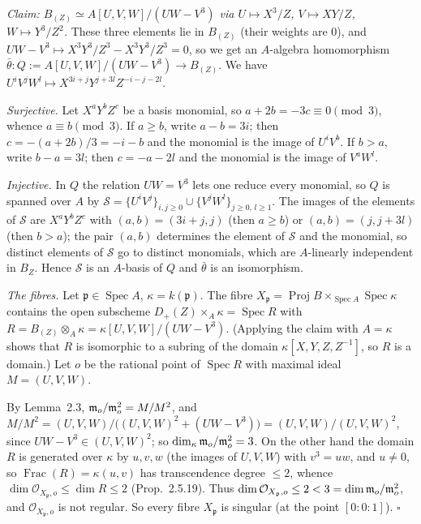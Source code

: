 \documentclass[11pt]{article}
\begin{document}
\emph{Claim: $B_{(Z)}\simeq A[U,V,W]/(UW-V^3)$ via $U\mapsto X^3/Z$, $V\mapsto XY/Z$, $W\mapsto Y^3/Z^2$.} These three elements lie in $B_{(Z)}$ (their weights are $0$), and $UW-V^3\mapsto X^3Y^3/Z^3-X^3Y^3/Z^3=0$, so we get an $A$-algebra homomorphism $\bar\theta:Q:=A[U,V,W]/(UW-V^3)\to B_{(Z)}$. We have $U^iV^jW^l\mapsto X^{3i+j}Y^{j+3l}Z^{-i-j-2l}$.

\emph{Surjective.} Let $X^aY^bZ^c$ be a basis monomial, so $a+2b=-3c\equiv0\pmod3$, whence $a\equiv b\pmod 3$. If $a\ge b$, write $a-b=3i$; then $c=-(a+2b)/3=-i-b$ and the monomial is the image of $U^iV^b$. If $b>a$, write $b-a=3l$; then $c=-a-2l$ and the monomial is the image of $V^aW^l$.

\emph{Injective.} In $Q$ the relation $UW=V^3$ lets one reduce every monomial, so $Q$ is spanned over $A$ by $\mathcal S=\{U^iV^j\}_{i,j\ge0}\cup\{V^jW^l\}_{j\ge0,\,l\ge1}$. The images of the elements of $\mathcal S$ are $X^aY^bZ^c$ with $(a,b)=(3i+j,j)$ (then $a\ge b$) or $(a,b)=(j,j+3l)$ (then $b>a$); the pair $(a,b)$ determines the element of $\mathcal S$ and the monomial, so distinct elements of $\mathcal S$ go to distinct monomials, which are $A$-linearly independent in $B_Z$. Hence $\mathcal S$ is an $A$-basis of $Q$ and $\bar\theta$ is an isomorphism.

\emph{The fibres.} Let $\mathfrak p\in\operatorname{Spec}A$, $\kappa=k(\mathfrak p)$. The fibre $X_{\mathfrak p}=\operatorname{Proj}B\times_{\operatorname{Spec}A}\operatorname{Spec}\kappa$ contains the open subscheme $D_+(Z)\times_A\kappa=\operatorname{Spec}R$ with $R=B_{(Z)}\otimes_A\kappa=\kappa[U,V,W]/(UW-V^3)$. (Applying the claim with $A=\kappa$ shows that $R$ is isomorphic to a subring of the domain $\kappa[X,Y,Z,Z^{-1}]$, so $R$ is a domain.) Let $o$ be the rational point of $\operatorname{Spec}R$ with maximal ideal $M=(U,V,W)$.

By Lemma~2.3, $\mathfrak m_o/\mathfrak m_o^2=M/M^2$, and $M/M^2=(U,V,W)/\bigl((U,V,W)^2+(UW-V^3)\bigr)=(U,V,W)/(U,V,W)^2$, since $UW-V^3\in(U,V,W)^2$; so $\dim_\kappa\mathfrak m_o/\mathfrak m_o^2=3$. On the other hand the domain $R$ is generated over $\kappa$ by $u,v,w$ (the images of $U,V,W$) with $v^3=uw$, and $u\ne0$, so $\operatorname{Frac}(R)=\kappa(u,v)$ has transcendence degree $\le2$, whence $\dim\mathcal O_{X_{\mathfrak p},o}\le\dim R\le2$ (Prop.~2.5.19). Thus $\dim\mathcal O_{X_{\mathfrak p},o}\le2<3=\dim\mathfrak m_o/\mathfrak m_o^2$, and $\mathcal O_{X_{\mathfrak p},o}$ is not regular. So every fibre $X_{\mathfrak p}$ is singular (at the point $[0:0:1]$). \hfill$\square$
\end{document}
